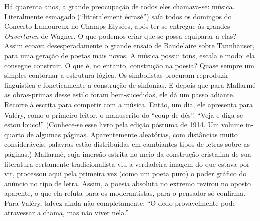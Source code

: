 Há quarenta anos, a grande preocupação de todos eles chamava-se: música.
Literalmente esmagado (``littéralement écrasé'') saía todos os domingos
do Concerto Lamoureux no Champs-Elysées, após ter se entregue às grandes
\emph{Ouverturen} de Wagner. O que podemos criar que se possa equiparar
a elas? Assim ecoava desesperadamente o grande ensaio de Baudelaire
sobre Tannhäuser, para uma geração de poetas mais novos. A música possui
tons, escala e modo: ela consegue construir. O que é, no entanto,
construção na poesia? Quase sempre um simples contornar a estrutura
lógica. Os simbolistas procuram reproduzir linguística e foneticamente a
construção de sinfonias. E depois que para Mallarmé as obras-primas
desse estilo foram bem-sucedidas, ele dá um passo adiante. Recorre à
escrita para competir com a música. Então, um dia, ele apresenta para
Valéry, como o primeiro leitor, o manuscrito do ``coup de dés''. ``Veja
e diga se estou louco!'' (Conhece-se esse livro pela edição póstuma de
1914. Um volume in-quarto de algumas páginas. Aparentemente aleatórias,
com distâncias muito consideráveis, palavras estão distribuídas em
cambiantes tipos de letras sobre as páginas.) Mallarmé, cuja imersão
estrita no meio da construção cristalina de sua literatura certamente
tradicionalista viu a verdadeira imagem do que estava por vir, processou
aqui pela primeira vez (como um poeta puro) o poder gráfico do anúncio
no tipo de letra. Assim, a poesia absoluta no extremo revirou no oposto
aparente, o que ela refuta para os moderantistas, para o pensador só
confirma. Para Valéry, talvez ainda não completamente: ``O dedo
provavelmente pode atravessar a chama, mas não viver nela.''
